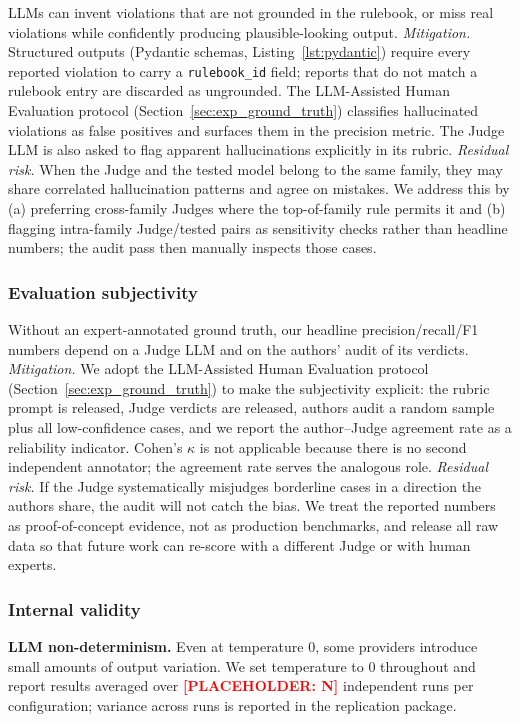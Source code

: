 \documentclass[smallextended]{svjour3}
\newcommand{\placeholder}[1]{\textcolor{red}{\textbf{[PLACEHOLDER: #1]}}}
\begin{document}
LLMs can invent violations that are not grounded in the rulebook, or miss real violations while confidently producing plausible-looking output.
\emph{Mitigation.}
Structured outputs (Pydantic schemas, Listing~\ref{lst:pydantic}) require every reported violation to carry a \texttt{rulebook\_id} field; reports that do not match a rulebook entry are discarded as ungrounded.
The LLM-Assisted Human Evaluation protocol (Section~\ref{sec:exp_ground_truth}) classifies hallucinated violations as false positives and surfaces them in the precision metric.
The Judge LLM is also asked to flag apparent hallucinations explicitly in its rubric.
\emph{Residual risk.}
When the Judge and the tested model belong to the same family, they may share correlated hallucination patterns and agree on mistakes.
We address this by (a) preferring cross-family Judges where the top-of-family rule permits it and (b) flagging intra-family Judge/tested pairs as sensitivity checks rather than headline numbers; the audit pass then manually inspects those cases.

\subsubsection{Evaluation subjectivity}

Without an expert-annotated ground truth, our headline precision/recall/F1 numbers depend on a Judge LLM and on the authors' audit of its verdicts.
\emph{Mitigation.}
We adopt the LLM-Assisted Human Evaluation protocol (Section~\ref{sec:exp_ground_truth}) to make the subjectivity explicit: the rubric prompt is released, Judge verdicts are released, authors audit a random sample plus all low-confidence cases, and we report the author--Judge agreement rate as a reliability indicator.
Cohen's $\kappa$ is not applicable because there is no second independent annotator; the agreement rate serves the analogous role.
\emph{Residual risk.}
If the Judge systematically misjudges borderline cases in a direction the authors share, the audit will not catch the bias.
We treat the reported numbers as proof-of-concept evidence, not as production benchmarks, and release all raw data so that future work can re-score with a different Judge or with human experts.

\subsubsection{Internal validity}

\textbf{LLM non-determinism.}
Even at temperature 0, some providers introduce small amounts of output variation.
We set temperature to 0 throughout and report results averaged over \placeholder{N} independent runs per configuration; variance across runs is reported in the replication package.
\end{document}
